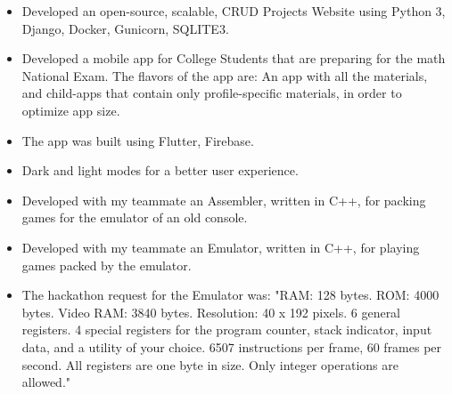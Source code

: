 \documentclass[10pt,a4paper,ragged2e]{resume}
\begin{document}
\begin{fullwidth}
        \begin{itemize}
            \item Developed an open-source, scalable, CRUD Projects Website using Python 3, Django, Docker, Gunicorn, SQLITE3.
        \end{itemize}
        \divider

        \begin{itemize}
            \item Developed a mobile app for College Students that are preparing for the math National Exam. The flavors of the app are: An app with all the materials, and child-apps that contain only profile-specific materials, in order to optimize app size.
            \item The app was built using Flutter, Firebase.
            \item Dark and light modes for a better user experience.
        \end{itemize}
        \divider

        \begin{itemize}
            \item Developed with my teammate an Assembler, written in C++, for packing games for the emulator of an old console.
        \end{itemize}
        \divider

        \begin{itemize}
            \item Developed with my teammate an Emulator, written in C++, for playing games packed by the emulator.
            \item The hackathon request for the Emulator was: "RAM: 128 bytes.
            ROM: 4000 bytes.
            Video RAM: 3840 bytes.
            Resolution: 40 x 192 pixels.
            6 general registers.
            4 special registers for the program counter, stack indicator, input data, and a utility of your choice.
            6507 instructions per frame, 60 frames per second.
            All registers are one byte in size.
            Only integer operations are allowed."
        \end{itemize}
        \divider


\end{fullwidth}
\end{document}
